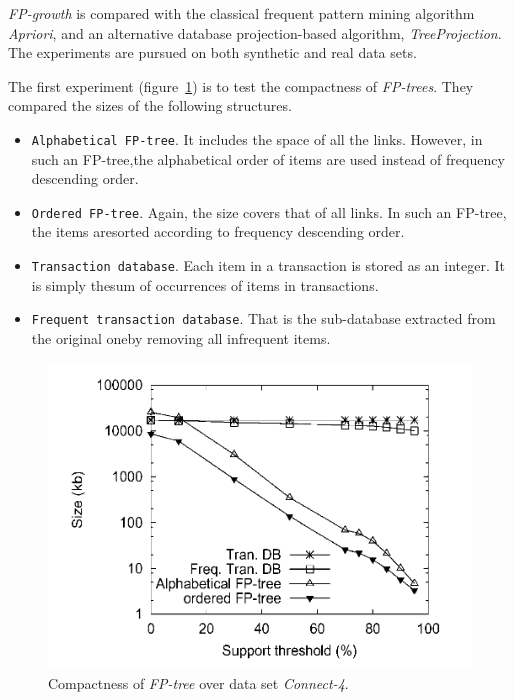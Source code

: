 \documentclass[12pt, a4paper]{article}
\newcommand{\code}[1]{\texttt{#1}}
\begin{document}
\textit{FP-growth} is compared with the classical frequent pattern mining algorithm \textit{Apriori}, and an alternative database projection-based algorithm, \textit{TreeProjection}. The experiments are pursued on both synthetic and real data sets.

The first experiment (figure~\ref{fig:compactness}) is to test the compactness of \textit{FP-trees}. They compared the sizes of the following structures.

\begin{itemize}
  \item \code{Alphabetical FP-tree}. It includes the space of all the links. However, in such an FP-tree,the alphabetical order of items are used instead of frequency descending order.
  \item \code{Ordered FP-tree}. Again, the size covers that of all links. In such an FP-tree, the items aresorted according to frequency descending order.
  \item \code{Transaction database}. Each item in a transaction is stored as an integer. It is simply thesum of occurrences of items in transactions.
  \item \code{Frequent transaction database}. That is the sub-database extracted from the original oneby removing all infrequent items.
\end{itemize}

\begin{figure}[H]
  \includegraphics[scale=0.6]{fp-tree-compactness}
  \centering
  \caption{Compactness of \textit{FP-tree} over data set \textit{Connect-4}.}
  \label{fig:compactness}
\end{figure}
\end{document}
